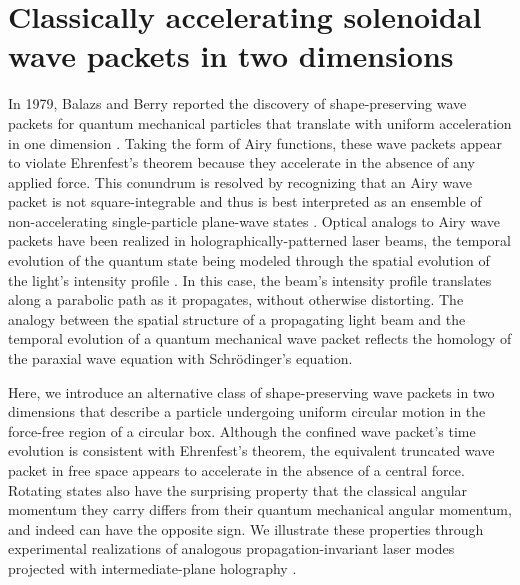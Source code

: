 \chapter{Classically accelerating solenoidal wave packets in two dimensions}
\label{ch:accelerating}


In 1979, Balazs and Berry reported the discovery of
shape-preserving wave packets for quantum mechanical particles
that translate with uniform
acceleration in one dimension \cite{balazs79}.
Taking the form of Airy functions, these wave packets
appear to violate Ehrenfest's theorem because
they accelerate in the absence of any applied force.
This conundrum is resolved by recognizing that an
Airy wave packet is not
square-integrable and thus is best interpreted as an 
ensemble of non-accelerating single-particle plane-wave states \cite{balazs79,ballentine94}.
Optical analogs to Airy wave packets
have been realized in holographically-patterned laser beams,
the temporal evolution of the quantum state being modeled through
the spatial evolution of the light's intensity profile
\cite{siviloglou07,siviloglou07a,kaminer12}.
In this case, the beam's intensity profile translates
along a parabolic path as it propagates, without
otherwise distorting.
The analogy between the spatial structure of a propagating
light beam and the temporal evolution of a quantum
mechanical wave packet reflects the homology of 
the paraxial wave equation with Schr\"odinger's equation.

Here, we introduce an alternative class of shape-preserving wave
packets in two dimensions \cite{Mondal_accelerating} 
that describe a particle undergoing
uniform circular motion
in the force-free region of a circular box.
Although the confined wave packet's time evolution is consistent with
Ehrenfest's theorem, the equivalent truncated wave packet in free
space appears to accelerate in the absence of a central force.
Rotating states also have the surprising property that
the classical angular momentum they carry
differs from their quantum mechanical angular momentum,
and indeed can have the opposite sign.
We illustrate these properties through experimental realizations
of analogous propagation-invariant laser modes projected
with intermediate-plane
holography \cite{mondal18}.

